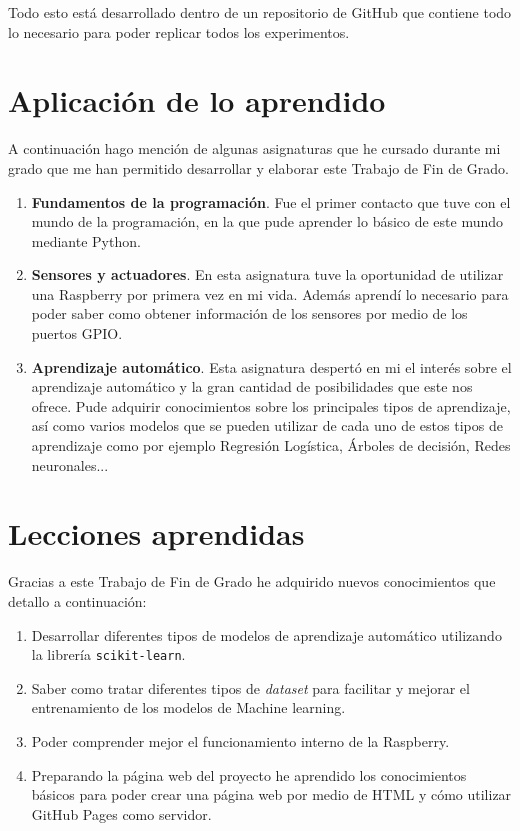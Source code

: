 \documentclass[a4paper, 12pt]{book}
\begin{document}
Todo esto está desarrollado dentro de un repositorio de GitHub que contiene todo lo necesario para poder replicar todos los experimentos.

\section{Aplicación de lo aprendido}
\label{sec:aplicacion}

A continuación hago mención de algunas asignaturas que he cursado durante mi grado que me han permitido desarrollar y elaborar este Trabajo de Fin de Grado.

\begin{enumerate}
    \item \textbf{Fundamentos de la programación}. Fue el primer contacto que tuve con el mundo de la programación, en la que pude aprender lo básico de este mundo mediante Python.

    \item \textbf{Sensores y actuadores}. En esta asignatura tuve la oportunidad de utilizar una Raspberry por primera vez en mi vida. Además aprendí lo necesario para poder saber como obtener información de los sensores por medio de los puertos GPIO.
    
    \item \textbf{Aprendizaje automático}. Esta asignatura despertó en mi el interés sobre el aprendizaje automático y la gran cantidad de posibilidades que este nos ofrece. Pude adquirir conocimientos sobre los principales tipos de aprendizaje, así como varios modelos que se pueden utilizar de cada uno de estos tipos de aprendizaje como por ejemplo Regresión Logística, Árboles de decisión, Redes neuronales...

\end{enumerate}


\section{Lecciones aprendidas}
\label{sec:lecciones_aprendidas}

Gracias a este Trabajo de Fin de Grado he adquirido nuevos conocimientos que detallo a continuación:

\begin{enumerate}
  \item Desarrollar diferentes tipos de modelos de aprendizaje automático utilizando la librería \texttt{scikit-learn}.
  \item Saber como tratar diferentes tipos de \textit{dataset} para facilitar y mejorar el entrenamiento de los modelos de Machine learning.
  \item Poder comprender mejor el funcionamiento interno de la Raspberry.
  \item Preparando la página web del proyecto he aprendido los conocimientos básicos para poder crear una página web por medio de HTML y cómo utilizar GitHub Pages como servidor.
\end{enumerate} 
\end{document}
